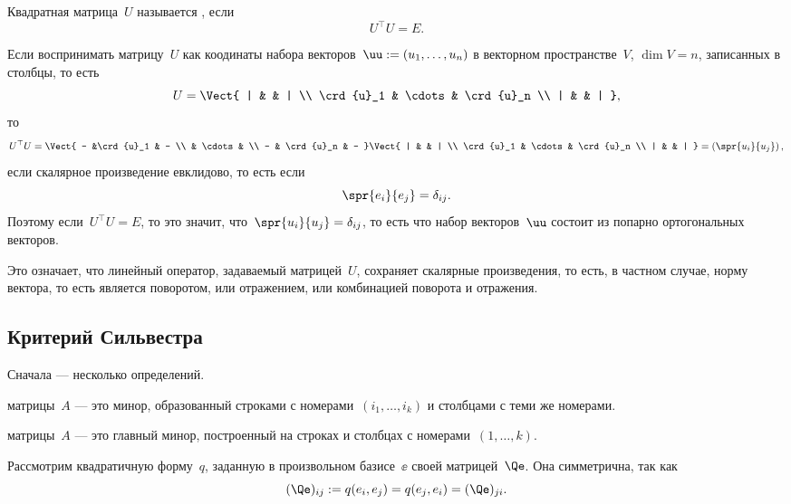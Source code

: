 \begin{definition}
	Квадратная матрица~$U$ называется , если
	\[
		U^\top U = E
		.
	\]
\end{definition}
\begin{remark}
	Если воспринимать матрицу~$U$ как коодинаты набора векторов~$\uu := (u_1, \dots, u_n)$ в векторном пространстве~$V$, $\dim{V} = n$, записанных в столбцы, то есть
	\[
		U =
		\Vect{
			| & & |
			\\
			\crd{u}_1 &
			\cdots &
			\crd{u}_n
			\\
			| & & |
		}
		,
	\]
	то
	\[
		U^\top U =
		\Vect{
			- &\crd{u}_1 & -
			\\
			& \cdots &
			\\
			- & \crd{u}_n & -
		}
		\Vect{
			| & & |
			\\
			\crd{u}_1 &
			\cdots &
			\crd{u}_n
			\\
			| & & |
		}
		=
		\left( 
			\spr{u_i}{u_j}
		\right)
		,
	\]
	если скалярное произведение евклидово, то есть если
	\[
		\spr{e_i}{e_j} = \delta_{ij}
		.
	\]
	Поэтому если~$U^\top U = E$, то это значит, что~$\spr{u_i}{u_j} = \delta_{ij}$, то есть что набор векторов~$\uu$ состоит из попарно ортогональных векторов.

	Это означает, что линейный оператор, задаваемый матрицей~$U$, сохраняет скалярные произведения, то есть, в частном случае, норму вектора, то есть является поворотом, или отражением, или комбинацией поворота и отражения.
\end{remark}

\subsection{Критерий Сильвестра}

Сначала --- несколько определений.

\begin{definition}
	 матрицы~$A$ --- это минор, образованный строками с номерами~$(i_1, \dots, i_k)$ и столбцами с теми же номерами.
\end{definition}

\begin{definition}
	 матрицы~$A$ --- это главный минор, построенный на строках и столбцах с номерами~$(1, \dots, k)$.
\end{definition}

Рассмотрим квадратичную форму~$q$, заданную в произвольном базисе~$\ee$ своей матрицей~$\Qe$. Она симметрична, так как
\[
	(\Qe)_{ij} := q(e_i, e_j) = q(e_j, e_i) = (\Qe)_{ji}
	.
\]

